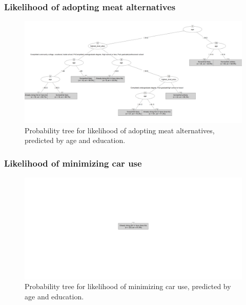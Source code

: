 \documentclass[
  letterpaper,
  DIV=11,
  numbers=noendperiod]{scrartcl}
\begin{document}
\subsubsection{Likelihood of adopting meat
alternatives}\label{likelihood-of-adopting-meat-alternatives}

\begin{figure}[H]

{\centering \includegraphics[width=10.67in,height=\textheight]{../data/04-model_data/protein_alternative_tree.png}

}

\caption{Probability tree for likelihood of adopting meat alternatives,
predicted by age and education.}

\end{figure}%

\subsubsection{Likelihood of minimizing car
use}\label{likelihood-of-minimizing-car-use}

\begin{figure}[H]

{\centering \includegraphics[width=10.67in,height=\textheight]{../data/04-model_data/minimize_car_tree.png}

}

\caption{Probability tree for likelihood of minimizing car use,
predicted by age and education.}

\end{figure}%
\end{document}
